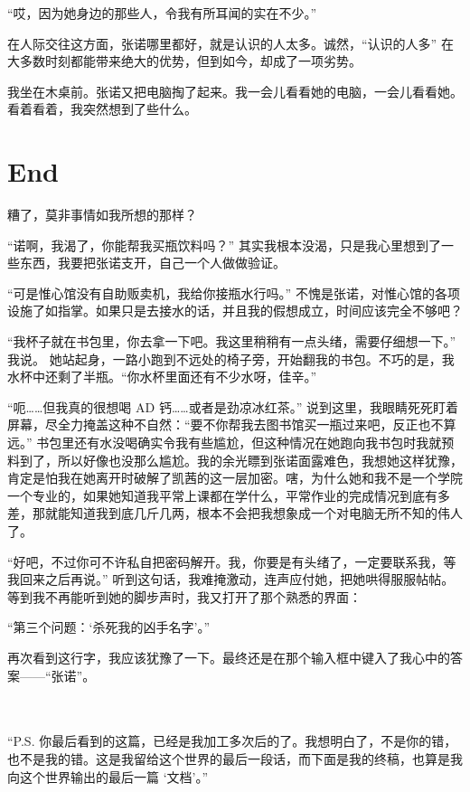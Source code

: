 \documentclass[UTF8]{ctexart}
\begin{document}
“哎，因为她身边的那些人，令我有所耳闻的实在不少。”

在人际交往这方面，张诺哪里都好，就是认识的人太多。诚然，“认识的人多” 在大多数时刻都能带来绝大的优势，但到如今，却成了一项劣势。

我坐在木桌前。张诺又把电脑掏了起来。我一会儿看看她的电脑，一会儿看看她。看着看着，我突然想到了些什么。

\section{End}

糟了，莫非事情如我所想的那样？

“诺啊，我渴了，你能帮我买瓶饮料吗？” 其实我根本没渴，只是我心里想到了一些东西，我要把张诺支开，自己一个人做做验证。

“可是惟心馆没有自助贩卖机，我给你接瓶水行吗。” 不愧是张诺，对惟心馆的各项设施了如指掌。如果只是去接水的话，并且我的假想成立，时间应该完全不够吧？

“我杯子就在书包里，你去拿一下吧。我这里稍稍有一点头绪，需要仔细想一下。” 我说。
她站起身，一路小跑到不远处的椅子旁，开始翻我的书包。不巧的是，我水杯中还剩了半瓶。“你水杯里面还有不少水呀，佳辛。”

“呃……但我真的很想喝 AD 钙……或者是劲凉冰红茶。” 说到这里，我眼睛死死盯着屏幕，尽全力掩盖这种不自然：“要不你帮我去图书馆买一瓶过来吧，反正也不算远。” 书包里还有水没喝确实令我有些尴尬，但这种情况在她跑向我书包时我就预料到了，所以好像也没那么尴尬。我的余光瞟到张诺面露难色，我想她这样犹豫，肯定是怕我在她离开时破解了凯茜的这一层加密。嗐，为什么她和我不是一个学院一个专业的，如果她知道我平常上课都在学什么，平常作业的完成情况到底有多差，那就能知道我到底几斤几两，根本不会把我想象成一个对电脑无所不知的伟人了。

“好吧，不过你可不许私自把密码解开。我，你要是有头绪了，一定要联系我，等我回来之后再说。” 听到这句话，我难掩激动，连声应付她，把她哄得服服帖帖。等到我不再能听到她的脚步声时，我又打开了那个熟悉的界面：

“第三个问题：‘杀死我的凶手名字’。”

再次看到这行字，我应该犹豫了一下。最终还是在那个输入框中键入了我心中的答案——“张诺”。

~\\
~\\

“P.S. 你最后看到的这篇，已经是我加工多次后的了。我想明白了，不是你的错，也不是我的错。这是我留给这个世界的最后一段话，而下面是我的终稿，也算是我向这个世界输出的最后一篇 ‘文档’。”
\end{document}
